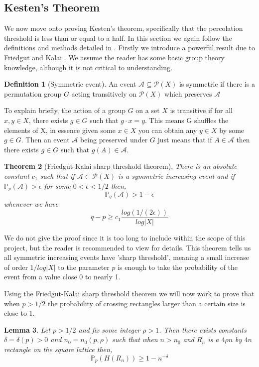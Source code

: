 \documentclass[a4paper,11pt]{article}
\newtheorem{theorem}{Theorem}[section]
\newtheorem{lemma}[theorem]{Lemma}
\theoremstyle{definition}
\newtheorem{definition}[theorem]{Definition}
\newcommand{\prob}{\mathbb{P}_p}
\begin{document}
\subsection{Kesten's Theorem}
We now move onto proving Kesten's theorem, specifically that the percolation threshold is less than or equal to a half. In this section we again follow the definitions and methods detailed in \cite{bollobas2006short}. Firstly we introduce a powerful result due to Friedgut and Kalai \cite{friedgut1996every}.
We assume the reader has some basic group theory knowledge, although it is not critical to understanding.

\begin{definition}[Symmetric event]
	An event $\mathcal{A} \subseteq \mathcal{P}(X)$ is symmetric if there is a permutation group  $G$ acting transitively on $\mathcal{P}(X)$ which preserves $\mathcal{A}$
\end{definition}
 To explain briefly, the action of a group $G$ on a set $X$ is transitive if for all $x,y \in X$, there exists $g \in G$ such that $g \cdot  x = y$. This means G shuffles the elements of X, in essence given some $x \in X$ you can obtain any $y \in X$ by some $g \in G$. Then an event $\mathcal{A}$ being preserved under $G$ just means that if $A \in \mathcal{A}$ then there exists $g \in G$ such that $g(A) \in \mathcal{A}$. 


\begin{theorem}[Friedgut-Kalai sharp threshold theorem]\label{sharpThreshold}
	There is an absolute constant $c_1$ such that if $\mathcal{A} \subset \mathcal{P}(X)$ is a symmetric increasing event and if $\prob(\mathcal{A}) > \epsilon$ for some $0 < \epsilon < 1/2$ then, 
	$$\mathbb{P}_q(\mathcal{A}) > 1 - \epsilon$$
	whenever we have 
	$$q - p \geq c_1 \frac{log(1/(2\epsilon))}{log |X|}$$
\end{theorem}

We do not give the proof since it is too long to include within the scope of this project, but the reader is recommended to view \cite{friedgut1996every} for details. This theorem tells us all symmetric increasing events have 'sharp threshold', meaning a small increase of order $1/log|X|$ to the parameter $p$ is enough to take the probability of the event from a value close 0 to nearly 1.

Using the Friedgut-Kalai sharp threshold theorem we will now work to prove that when $p>1/2$ the probability of crossing rectangles larger than a certain size is close to 1.

\begin{lemma}\label{kesternLemma}
	Let $p >1/2$ and fix some integer $\rho >1$. Then there exists constants $\delta = \delta(p) > 0$ and $n_0 = n_0(p,\rho)$ such that when $n > n_0$ and $R_n$ is a $4\rho n$ by $4n$ rectangle on the square lattice then, $$\prob(H(R_n)) \geq 1-n^{-\delta}$$
\end{lemma}
\end{document}
